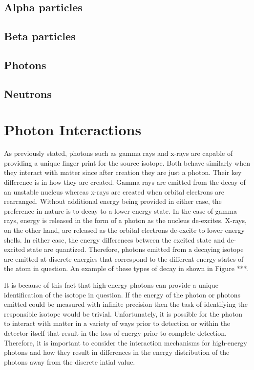 \subsection{Alpha particles}
\subsection{Beta particles}
\subsection{Photons}
\subsection{Neutrons}

\section{Photon Interactions}
As previously stated, photons such as gamma rays and x-rays are capable of providing a unique finger print for the source isotope.  Both behave similarly when they interact with matter since after creation they are just a photon.  Their key difference is in how they are created.  Gamma rays are emitted from the decay of an unstable nucleus whereas x-rays are created when orbital electrons are rearranged.  Without additional energy being provided in either case, the preference in nature is to decay to a lower energy state.  In the case of gamma rays, energy is released in the form of a photon as the nucleus de-excites.  X-rays, on the other hand, are released as the orbital electrons de-excite to lower energy shells.  In either case, the energy differences between the excited state and de-excited state are quantized.    Therefore, photons emitted from a decaying isotope are emitted at discrete energies that correspond to the different energy states of the atom in question.  An example of these types of decay in shown in Figure ***.  


It is because of this fact that high-energy photons can provide a unique identification of the isotope in question.  If the energy of the photon or photons emitted could be measured with infinite precision then the task of identifying the responsible isotope would be trivial.  Unfortunately, it is possible for the photon to interact with matter in a variety of ways prior to detection or within the detector itself that result in the loss of energy prior to complete detection.  Therefore, it is important to consider the interaction mechanisms for high-energy photons and how they result in differences in the energy distribution of the photons away from the discrete intial value.

